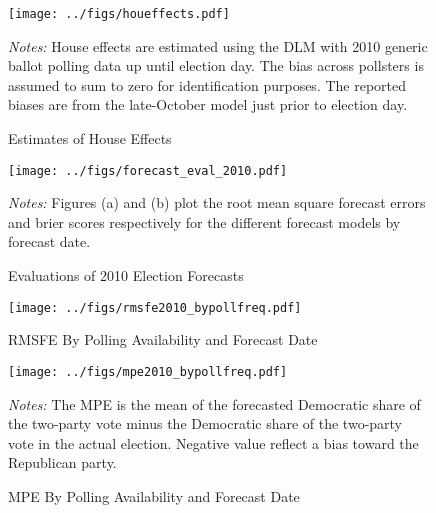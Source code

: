 \documentclass[12pt,final,fleqn]{article}
\theoremstyle{plain}
\begin{document}
\begin{figure}[!htb]
\begin{center}
\texttt{[image: ../figs/houeffects.pdf]}
\vspace{.5cm}
\caption{Estimates of House Effects}
\label{fig:house_effects}
\begin{minipage}{\linewidth}
\footnotesize
\emph{Notes:} House effects are estimated using the DLM with 2010 generic ballot polling data up until election day. The bias across pollsters is assumed to sum to zero for identification purposes. The reported biases are from the late-October model just prior to election day.
\end{minipage}
\end{center}
\end{figure}

\begin{figure}[!htb]
\centering
\texttt{[image: ../figs/forecast\_eval\_2010.pdf]}
\vspace{.5cm}
\caption{Evaluations of 2010 Election Forecasts}
\label{fig:eval_2010_forecast}
\begin{minipage}{\linewidth}
\footnotesize
\emph{Notes:} Figures (a) and (b) plot the root mean square forecast errors and brier scores respectively for the different forecast models by forecast date. 
\end{minipage}
\end{figure}

\begin{figure}[!htb]
\begin{center}
\texttt{[image: ../figs/rmsfe2010\_bypollfreq.pdf]}
\vspace{.5cm}
\caption{RMSFE By Polling Availability and Forecast Date}
\label{fig:RMSFE By Polling Availability and Forecast Date}
\begin{minipage}{\linewidth}
\footnotesize
\end{minipage}
\end{center}
\end{figure}

\begin{figure}[!htb]
\begin{center}
\texttt{[image: ../figs/mpe2010\_bypollfreq.pdf]}
\vspace{.5cm}
\caption{MPE By Polling Availability and Forecast Date}
\label{fig:MPE By Polling Availability and Forecast Date}
\begin{minipage}{\linewidth}
\footnotesize
\emph{Notes:} The MPE is the mean of the forecasted Democratic share of the two-party vote minus the Democratic share of the two-party vote in the actual election. Negative value reflect a bias toward the Republican party.
\end{minipage}
\end{center}
\end{figure}
\end{document}
